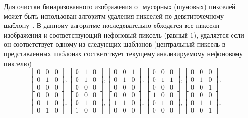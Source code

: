 \documentclass[a4paper,12pt,russian]{article} %
\begin{document}
Для очистки бинаризованного изображения от мусорных (шумовых) пикселей может быть использован алгоритм удаления пикселей по девятиточечному шаблону~\cite{babu2014handwritten}.
В данному алгоритме последовательно обходятся все пиксели изображения и соответствующий нефоновый пиксель (равный $1$), удаляется если он соответствует одному из следующих шаблонов (центральный пиксель в представленных шаблонах соответствует текущему анализируемому нефоновому пикселю)
$$
	\begin{bmatrix}
		0 & 0 & 0 \\
		0 & 1 & 0 \\
		0 & 0 & 0
	\end{bmatrix},
	\begin{bmatrix}
		0 & 1 & 0 \\
		0 & 1 & 0 \\
		0 & 0 & 0
	\end{bmatrix},
	\begin{bmatrix}
		0 & 0 & 1 \\
		0 & 1 & 0 \\
		0 & 0 & 0
	\end{bmatrix},
	\begin{bmatrix}
		0 & 0 & 0 \\
		0 & 1 & 1 \\
		0 & 0 & 0
	\end{bmatrix},
	\begin{bmatrix}
		0 & 0 & 0 \\
		0 & 1 & 0 \\
		0 & 0 & 1
	\end{bmatrix},
$$
$$
	\begin{bmatrix}
		0 & 0 & 0 \\
		0 & 1 & 0 \\
		0 & 1 & 0
	\end{bmatrix},
	\begin{bmatrix}
		0 & 0 & 0 \\
		0 & 1 & 0 \\
		1 & 0 & 0
	\end{bmatrix},
	\begin{bmatrix}
		0 & 0 & 0 \\
		1 & 1 & 0 \\
		0 & 0 & 0
	\end{bmatrix},
	\begin{bmatrix}
		1 & 0 & 0 \\
		0 & 1 & 0 \\
		0 & 0 & 0
	\end{bmatrix},
	\begin{bmatrix}
		0 & 0 & 0 \\
		0 & 1 & 1 \\
		0 & 0 & 1
	\end{bmatrix},
$$
\end{document}
